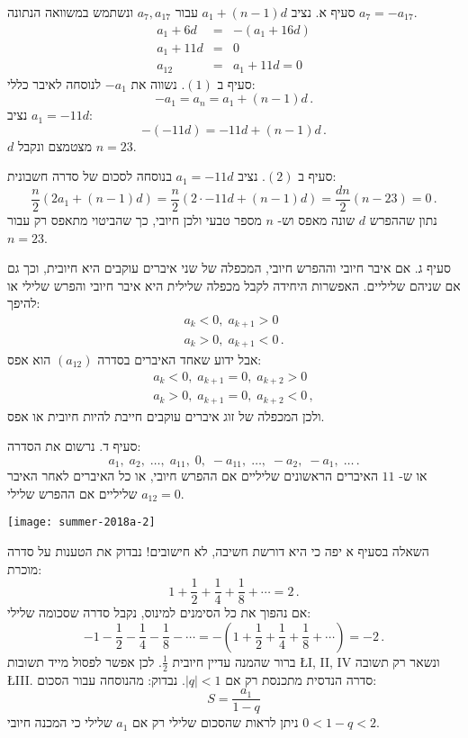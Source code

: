 סעיף א. נציב 
$a_1+(n-1)d$
עבור 
$a_7,a_{17}$
ונשתמש במשוואה הנתונה
$a_7=-a_{17}$.
\begin{eqnarray*}
a_1+6d &=& -(a_1+16d)\\
a_1+11d &=& 0\\
a_{12} &=&a_1+11d = 0
\end{eqnarray*}
סעיף ב
$(1)$.
נשווה את
$-a_1$
לנוסחה לאיבר כללי:
\[
-a_1 = a_n = a_1 + (n-1)d\,.
\]
נציב
$a_1=-11d$:
\[
-(-11d) = -11d + (n-1)d\,.
\]
$d$
מצטמצם ונקבל
$n=23$.

סעיף ב
$(2)$.
נציב
$a_1=-11d$
 בנוסחה לסכום של סדרה חשבונית:
\[
\frac{n}{2}(2a_1+(n-1)d) = \frac{n}{2}(2\cdot -11d+(n-1)d) =\frac{dn}{2} (n-23)=0\,.
\]
נתון שההפרש 
$d$
שונה מאפס וש-%
$n$
מספר טבעי ולכן חיובי, כך שהביטוי מתאפס רק עבור
$n=23$.

סעיף ג. אם איבר חיובי וההפרש חיובי, המכפלה של שני איברים עוקבים היא חיובית, וכך גם אם שניהם שליליים. האפשרות היחידה לקבל מכפלה שלילית היא איבר חיובי והפרש שלילי או להיפך:
\[
\begin{array}{l}
a_k<0,\; a_{k+1}>0\\
a_k>0,\; a_{k+1}<0\,.
\end{array}
\]
אבל ידוע שאחד האיברים בסדרה 
$(a_{12})$
הוא אפס:
\[
\begin{array}{l}
a_k<0,\; a_{k+1}=0,\; a_{k+2}>0\\
a_k>0,\; a_{k+1}=0,\; a_{k+2}<0\,,
\end{array}
\]
ולכן המכפלה של זוג איברים עוקבים חייבת להיות חיובית או אפס.

סעיף ד. נרשום את הסדרה:
\[
a_1,\; a_2,\; \ldots,\; a_{11},\; 0,\; -a_{11},\; \ldots,\; -a_2,\; -a_1,\; \ldots\,.
\]
או ש-%
$11$
האיברים הראשונים שליליים אם ההפרש חיובי, או כל האיברים לאחר האיבר
$a_{12}=0$
שליליים אם ההפרש שלילי.

\newpage

\textbf{}

\begin{center}
\texttt{[image: summer-2018a-2]}
\end{center}

השאלה בסעיף א יפה כי היא דורשת חשיבה, לא חישובים! נבדוק את הטענות על סדרה מוכרת:
\[
1+ \frac{1}{2} + \frac{1}{4} + \frac{1}{8} + \cdots = 2\,.
\]
אם נהפוך את כל הסימנים למינוס, נקבל סדרה שסכומה שלילי:
\[
-1 - \frac{1}{2} - \frac{1}{4} - \frac{1}{8} - \cdots = -\left(1+ \frac{1}{2} + \frac{1}{4} + \frac{1}{8} + \cdots\right) = -2\,.
\]
ברור שהמנה עדיין חיובית
$\frac{1}{2}$.
לכן אפשר לפסול מייד תשובות 
\L{I, II, IV}
ונשאר רק תשובה
\L{III}.
סדרה הנדסית מתכנסת רק אם
$|q|<1$.
נבדוק: מהנוסחה עבור הסכום:
\[
S = \frac{a_1}{1-q}
\]
ניתן לראות שהסכום שלילי רק אם 
$a_1$
שלילי כי המכנה חיובי
$0 < 1-q < 2$.

